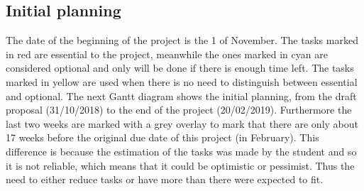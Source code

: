 \subsection{Initial planning}







\newcommand{\Duno}{0}
\newcommand{\Ddos}{7}
\newcommand{\Dtres}{28}
\newcommand{\Dcuatro}{7}
\newcommand{\Dcinco}{21}
\newcommand{\Dseis}{7}
\newcommand{\Dsiete}{21}
\newcommand{\Docho}{14}
\newcommand{\Dnueve}{14}
\newcommand{\Ddiez}{14}

\newcommand{\Funo}{\the\numexpr \Duno /7 \relax}
\newcommand{\Fdos}{\the\numexpr \Funo + \Ddos/7 \relax}
\newcommand{\Ftres}{\the\numexpr \Fdos + \Dtres/7 \relax}
\newcommand{\Fcuatro}{\the\numexpr \Ftres + \Dcuatro/7 \relax}
\newcommand{\Fcinco}{\the\numexpr \Fcuatro + \Dcinco/7 \relax}
\newcommand{\Fseis}{\the\numexpr \Fcinco + \Dseis/7 \relax}
\newcommand{\Fsiete}{\the\numexpr \Fseis + \Dsiete/7 \relax}
\newcommand{\Focho}{\the\numexpr \Fsiete + \Docho/7 \relax}
\newcommand{\Fnueve}{\the\numexpr \Focho + \Dnueve/7 \relax}
\newcommand{\Fdiez}{\the\numexpr \Fnueve + \Ddiez/7 \relax}

\newcommand{\Frequirement}{2}

\newcommand{\Plen}{19} %

\newcommand{\Dlen}{0} %

\newcommand{\Cimportant}{red!70}
\newcommand{\Coptional}{cyan!30}
\newcommand{\Cnormal}{yellow!80}


The date of the beginning of the project is the 1 of November.
\linej
\linej
The tasks marked in \colorbox{\Cimportant}{red} are essential to the project, meanwhile the ones marked in \colorbox{\Coptional}{cyan} are considered optional and only will be done if there is enough time left. The tasks marked in \colorbox{\Cnormal}{yellow} are used when there is no need to distinguish between essential and optional.
\linej
\linej
The next Gantt diagram shows the initial planning, from the draft proposal (31/10/2018) to the end of the project (20/02/2019).
\linej
Furthermore the last two weeks are marked with a grey overlay to mark that there are only about 17 weeks before the original due date of this project (in February). This difference is because the estimation of the tasks was made by the student and so it is not reliable, which means that it could be optimistic or pessimist. Thus the need to either reduce tasks or have more than there were expected to fit.


